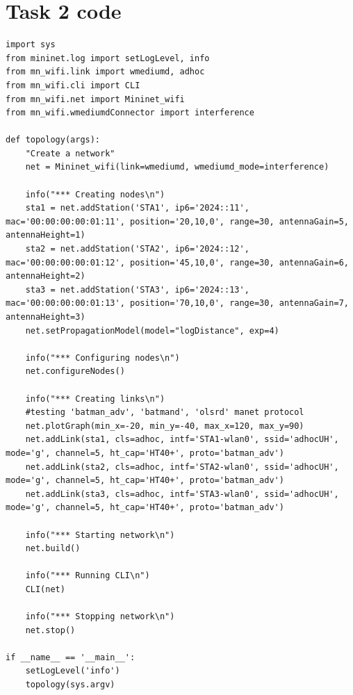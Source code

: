 \documentclass{article}
\begin{document}
\section{Task 2 code}
\begin{lstlisting}
import sys
from mininet.log import setLogLevel, info
from mn_wifi.link import wmediumd, adhoc
from mn_wifi.cli import CLI
from mn_wifi.net import Mininet_wifi
from mn_wifi.wmediumdConnector import interference

def topology(args):
    "Create a network"
    net = Mininet_wifi(link=wmediumd, wmediumd_mode=interference) 

    info("*** Creating nodes\n")
    sta1 = net.addStation('STA1', ip6='2024::11', mac='00:00:00:00:01:11', position='20,10,0', range=30, antennaGain=5, antennaHeight=1)
    sta2 = net.addStation('STA2', ip6='2024::12', mac='00:00:00:00:01:12', position='45,10,0', range=30, antennaGain=6, antennaHeight=2)
    sta3 = net.addStation('STA3', ip6='2024::13', mac='00:00:00:00:01:13', position='70,10,0', range=30, antennaGain=7, antennaHeight=3)
    net.setPropagationModel(model="logDistance", exp=4)

    info("*** Configuring nodes\n")
    net.configureNodes()

    info("*** Creating links\n")
    #testing 'batman_adv', 'batmand', 'olsrd' manet protocol
    net.plotGraph(min_x=-20, min_y=-40, max_x=120, max_y=90)
    net.addLink(sta1, cls=adhoc, intf='STA1-wlan0', ssid='adhocUH', mode='g', channel=5, ht_cap='HT40+', proto='batman_adv')
    net.addLink(sta2, cls=adhoc, intf='STA2-wlan0', ssid='adhocUH', mode='g', channel=5, ht_cap='HT40+', proto='batman_adv')
    net.addLink(sta3, cls=adhoc, intf='STA3-wlan0', ssid='adhocUH', mode='g', channel=5, ht_cap='HT40+', proto='batman_adv')
    
    info("*** Starting network\n")
    net.build()

    info("*** Running CLI\n")
    CLI(net)

    info("*** Stopping network\n")
    net.stop()

if __name__ == '__main__':
    setLogLevel('info')
    topology(sys.argv)
\end{lstlisting}
\end{document}
